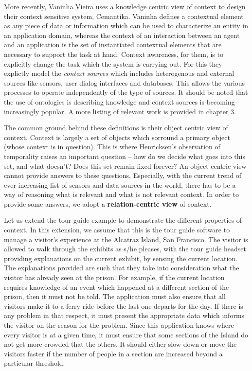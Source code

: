 More recently, Vaninha Vieira \cite{vieira2011designing} uses a knowledge centric view of context to design their context sensitive system, Cemantika. Vaninha defines a contextual element as any piece of data or information which can be used to characterize an entity in an application domain, whereas the context of an interaction between an agent and an application is the set of instantiated contextual elements that are necessary to support the task at hand. Context awareness, for them, is to explicitly change the task which the system is carrying out. For this they explictly model the \textit{context sources} which includes heterogenous and  external sources like sensors, user dialog interfaces and databases. This allows the various processes to operate independently of the type of sources. It should be noted that the use of ontologies is describing knowledge and context sources is becoming increasingly popular. A more listing of relevant work is provided in chapter 3.

The common ground behind these definitions is their object centric view of context. Context is largely a set of objects which sorround a primary object (whose context is in question). This is where Henricksen's observation of temporality raises an important question -- how do we decide what goes into this set, and what doesn't? Does this set remain fixed forever? An object centric view cannot provide answers to these questions. Especially, with the current trend of ever increasing list of sensors and data sources in the world, there has to be a way of reasoning what is relevant and what is not relevant context. In order to provide some answers, we adopt a \textbf{relation-centric view} of context.

Let us extend the tour guide example to demonstrate the different properties of context. In this extension, we assume that this is the tour guide software to manage a visitor's experience at the Alcatraz Island, San Francisco. The visitor is allowed to walk through the exhibits as s/he pleases, with the tour guide headset providing explanations on the current exhibit, by sensing the current location. The explanations provided are such that they take into consideration what the visitor has already seen at the prison. For example, if the current location requires knowledge of an event which happened at a different section of the prison, then it must not be told. The application must also ensure that all visitors make it to a ferry ride before the last one departs for the day. If there is any problem in that respect, it must present the appropriate data which informs the visitor on the reason for the problem. Since this application knows where every visitor is at a given time, it must ensure that some sections of the Island do not get more crowded that the others. It should either slow down or move the visitors faster if the number of people in a section are increased beyond a particular threshold.

